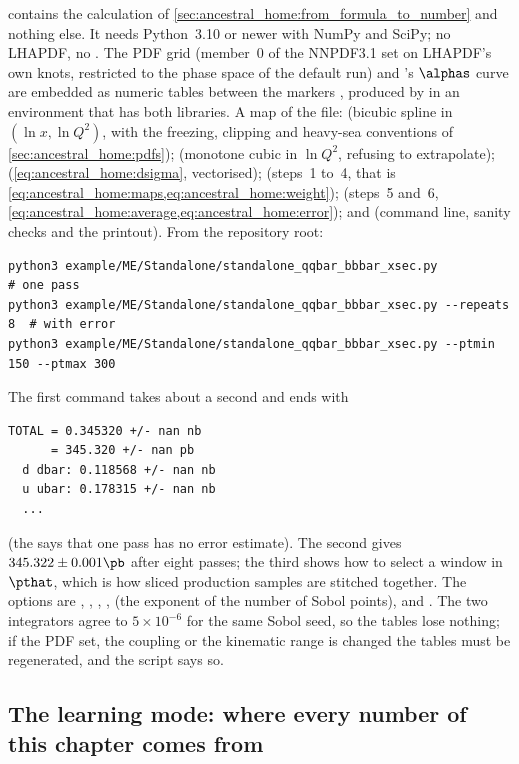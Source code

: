  contains the
calculation of \cref{sec:ancestral_home:from_formula_to_number} and nothing
else. It needs Python~3.10 or newer with NumPy and SciPy; no LHAPDF, no
\PYTHIA. The PDF grid (member~0 of the NNPDF3.1 set on LHAPDF's own knots,
restricted to the phase space of the default run) and \PYTHIA's $\alphas$
curve are embedded as numeric tables between the markers
, produced by
 in an environment that has both libraries.
A map of the file:  (bicubic spline in $(\ln x,\ln Q^2)$,
with the freezing, clipping and heavy-sea conventions of
\cref{sec:ancestral_home:pdfs});  (monotone cubic in
$\ln Q^2$, refusing to extrapolate); 
(\cref{eq:ancestral_home:dsigma}, vectorised);  (steps~1
to~4, that is \cref{eq:ancestral_home:maps,eq:ancestral_home:weight});
 (steps~5 and~6, \cref{eq:ancestral_home:average,eq:ancestral_home:error});
and  (command line, sanity checks and the printout). From the
repository root:
\begin{verbatim}
python3 example/ME/Standalone/standalone_qqbar_bbbar_xsec.py              # one pass
python3 example/ME/Standalone/standalone_qqbar_bbbar_xsec.py --repeats 8  # with error
python3 example/ME/Standalone/standalone_qqbar_bbbar_xsec.py --ptmin 150 --ptmax 300
\end{verbatim}
The first command takes about a second and ends with
\begin{verbatim}
TOTAL = 0.345320 +/- nan nb
      = 345.320 +/- nan pb
  d dbar: 0.118568 +/- nan nb
  u ubar: 0.178315 +/- nan nb
  ...
\end{verbatim}
(the  says that one pass has no error estimate). The second gives
$345.322\pm0.001\pb$ after eight passes; the third shows how to select a
window in $\pthat$, which is how sliced production samples are stitched
together. The options are , , ,
,  (the exponent of the number of Sobol points),
 and . The two integrators agree to
$5\times10^{-6}$ for the same Sobol seed, so the tables lose nothing; if the
PDF set, the coupling or the kinematic range is changed the tables must be
regenerated, and the script says so.

\subsection{The learning mode: where every number of this chapter comes from}
\label{sec:ancestral_home:learning_mode}

